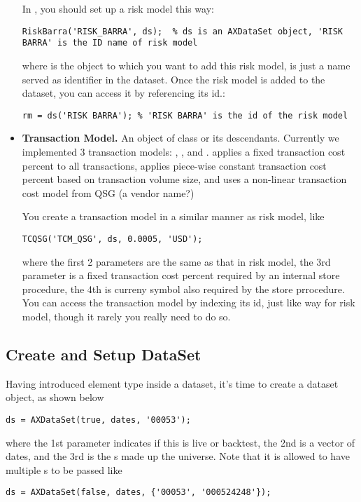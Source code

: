 \begin{itemize}
          In \matlab{}, you should set up a risk model this way:
   \begin{lstlisting}[numbers=none]
   RiskBarra('RISK_BARRA', ds);  % ds is an AXDataSet object, 'RISK BARRA' is the ID name of risk model
   \end{lstlisting}
   where  is the  object to which you want to add this risk model, 
    is just a name served as identifier in the dataset. 
   Once the risk model is added to the dataset, you can access it by referencing its id.:
   \begin{lstlisting}[numbers=none]
   rm = ds('RISK BARRA'); % 'RISK BARRA' is the id of the risk model
   \end{lstlisting}
   
    \item \textbf{Transaction Model.}
    An object of class  or its descendants.
    Currently we implemented 3 transaction models: , , and .
     applies a fixed transaction cost percent to all transactions,
     applies piece-wise constant transaction cost percent based on transaction volume size,
    and  uses a non-linear transaction cost model from QSG (a vendor name?)

    You create a transaction model in a similar manner as risk model, like
   \begin{lstlisting}[numbers=none]
   TCQSG('TCM_QSG', ds, 0.0005, 'USD');  
   \end{lstlisting}
   where the first 2 parameters are the same as that in risk model, 
   the 3rd parameter is a fixed transaction cost percent required by an internal store procedure,
   the 4th is curreny symbol also required by the store prrocedure.
   You can access the transaction model by indexing its id, just like way for risk model, 
   though it rarely you really need to do so.
\end{itemize}

\subsection{Create and Setup DataSet}

Having introduced element type inside a dataset, it's time to create a dataset object, as shown below
\begin{lstlisting}[numbers=none]
  ds = AXDataSet(true, dates, '00053');
\end{lstlisting}
where the 1st parameter indicates if this is live or backtest,
the 2nd is a vector of dates,
and the 3rd is the s made up the universe.
Note that it is allowed to have multiple s to be passed like
\begin{lstlisting}[numbers=none]
  ds = AXDataSet(false, dates, {'00053', '000524248'});
\end{lstlisting}

